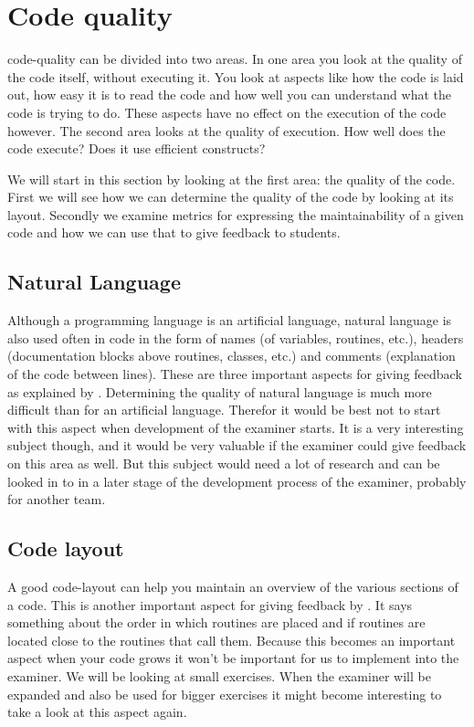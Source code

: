 \section{Code quality}

\Gls{code-quality} can be divided into two areas.
In one area you look at the quality of the \gls{code} itself,
without executing it.
You look at aspects like how the \gls{code} is laid out,
how easy it is to read the \gls{code}
and how well you can understand what the \gls{code} is trying to do.
These aspects have no effect on the execution of the \gls{code} however.
The second area looks at the quality of execution. How well
does the \gls{code} execute? Does it use efficient \glspl{construct}?

We will start in this section by looking at the first area:
the quality of the \gls{code}.
First we will see how we can determine the quality of the \gls{code}
by looking at its layout.
Secondly we examine metrics for expressing the \gls{maintainability}
of a given \gls{code} and how we can use that
to give \gls{feedback} to \glspl{student}.

\subsection{Natural Language}

Although a programming language is an artificial language,
natural language is also used often in code in the form of
names (of variables, routines, etc.),
headers (documentation blocks above routines, classes, etc.)
and comments (explanation of the code between lines).
These are three important aspects for giving \gls{feedback}
as explained by \citet{stegeman2014empirically}.
Determining the quality of natural language is much more difficult
than for an artificial language.
Therefor it would be best not to start with this aspect
when development of the \gls{examiner} starts.
It is a very interesting subject though,
and it would be very valuable if the \gls{examiner} could give \gls{feedback}
on this area as well.
But this subject would need a lot of research and can be looked in to
in a later stage of the development process of the \gls{examiner},
probably for another team.

\subsection{Code layout}

A good \Gls{code-layout} can help you maintain an overview
of the various sections of a \gls{code}.
This is another important aspect for giving feedback
by \citet{stegeman2014empirically}.
It says something about the order in which routines are placed
and if routines are located close to the routines that call them.
Because this becomes an important aspect when your \gls{code} grows
it won't be important for us to implement into the \gls{examiner}.
We will be looking at small \glspl{exercise}.
When the \gls{examiner} will be expanded
and also be used for bigger \glspl{exercise}
it might become interesting to take a look at this aspect again.

